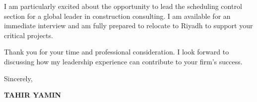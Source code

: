 \documentclass[11pt,a4paper]{article}
\begin{document}
I am particularly excited about the opportunity to lead the scheduling control section for a global leader in construction consulting. I am available for an immediate interview and am fully prepared to relocate to Riyadh to support your critical projects.

Thank you for your time and professional consideration. I look forward to discussing how my leadership experience can contribute to your firm's success.

\vspace{0.5cm}
Sincerely,

\vspace{0.5cm}
\textbf{TAHIR YAMIN}
\end{document}
